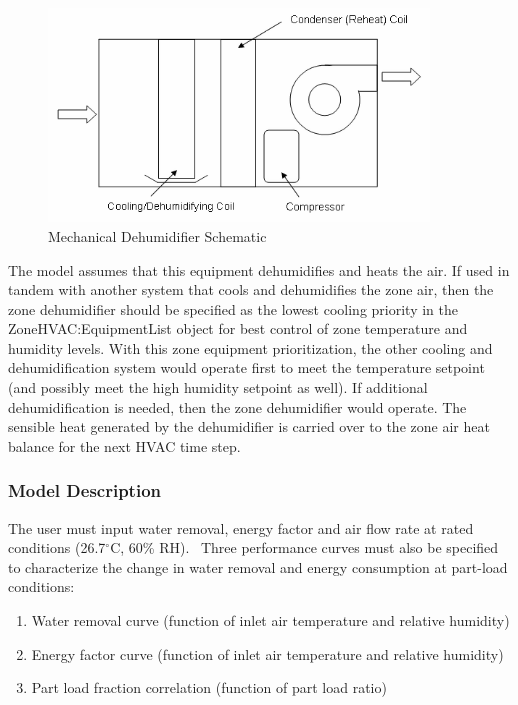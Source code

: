 \begin{figure}[hbtp] %
\centering
\includegraphics[width=0.9\textwidth, height=0.9\textheight, keepaspectratio=true]{media/image7287.png}
\caption{Mechanical Dehumidifier Schematic \protect \label{fig:mechanical-dehumidifier-schematic}}
\end{figure}

The model assumes that this equipment dehumidifies and heats the air. If used in tandem with another system that cools and dehumidifies the zone air, then the zone dehumidifier should be specified as the lowest cooling priority in the ZoneHVAC:EquipmentList object for best control of zone temperature and humidity levels. With this zone equipment prioritization, the other cooling and dehumidification system would operate first to meet the temperature setpoint (and possibly meet the high humidity setpoint as well). If additional dehumidification is needed, then the zone dehumidifier would operate. The sensible heat generated by the dehumidifier is carried over to the zone air heat balance for the next HVAC time step.

\subsubsection{Model Description}\label{model-description-2-007}

The user must input water removal, energy factor and air flow rate at rated conditions (26.7\(^{\circ}\)C, 60\% RH).~ Three performance curves must also be specified to characterize the change in water removal and energy consumption at part-load conditions:

\begin{enumerate}
\item Water removal curve (function of inlet air temperature and relative humidity)
\item Energy factor curve (function of inlet air temperature and relative humidity)
\item Part load fraction correlation (function of part load ratio)
\end{enumerate}

